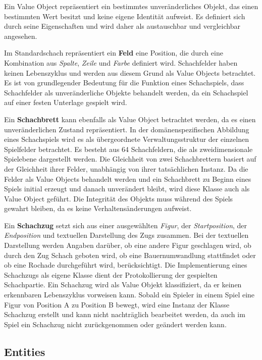 Ein Value Object repräsentiert ein bestimmtes unveränderliches Objekt, das einen bestimmten Wert besitzt und keine eigene Identität aufweist. 
Es definiert sich durch seine Eigenschaften und wird daher als austauschbar und vergleichbar angesehen.

Im Standardschach repräsentiert ein \textbf{Feld} eine Position, die durch eine Kombination aus \textit{Spalte}, \textit{Zeile} und \textit{Farbe} definiert wird. 
Schachfelder haben keinen Lebenszyklus und werden aus diesem Grund als Value Objects betrachtet. 
Es ist von grundlegender Bedeutung für die Funktion eines Schachspiels, dass Schachfelder als unveränderliche Objekte behandelt werden, da ein Schachspiel auf einer \glqq festen Unterlage\grqq{} gespielt wird. 

Ein \textbf{Schachbrett} kann ebenfalls als Value Object betrachtet werden, da es einen unveränderlichen Zustand repräsentiert. 
In der domänenspezifischen Abbildung eines Schachspiels wird es als übergeordnete Verwaltungsstruktur der einzelnen Spielfelder betrachtet. 
Es besteht aus 64 Schachfeldern, die als zweidimensionale Spielebene dargestellt werden.
Die Gleichheit von zwei Schachbrettern basiert auf der Gleichheit ihrer Felder, unabhängig von ihrer tatsächlichen Instanz. 
Da die Felder als Value Objects behandelt werden und ein Schachbrett zu Beginn eines Spiels initial erzeugt und danach unverändert bleibt, wird diese Klasse auch als Value Object geführt. 
Die Integrität des Objekts muss während des Spiels gewahrt bleiben, da es keine Verhaltensänderungen aufweist. 

Ein \textbf{Schachzug} setzt sich aus einer ausgewählten \textit{Figur}, der \textit{Startposition}, der \textit{Endposition} und textuellen Darstellung des Zugs zusammen.
Bei der textuellen Darstellung werden Angaben darüber, ob eine andere Figur geschlagen wird, ob durch den Zug Schach geboten wird, ob eine Bauernumwandlung stattfindet oder ob eine Rochade durchgeführt wird, berücksichtigt. 
Die Implementierung eines Schachzugs als eigene Klasse dient der Protokollierung der gespielten Schachpartie. 
Ein Schachzug wird als Value Objekt klassifiziert, da er keinen erkennbaren Lebenszyklus vorweisen kann. 
Sobald ein Spieler in einem Spiel eine Figur von Position A zu Position B bewegt, wird eine Instanz der Klasse Schachzug erstellt und kann nicht nachträglich bearbeitet werden, da auch im Spiel ein Schachzug nicht zurückgenommen oder geändert werden kann. 

\subsection{Entities}

